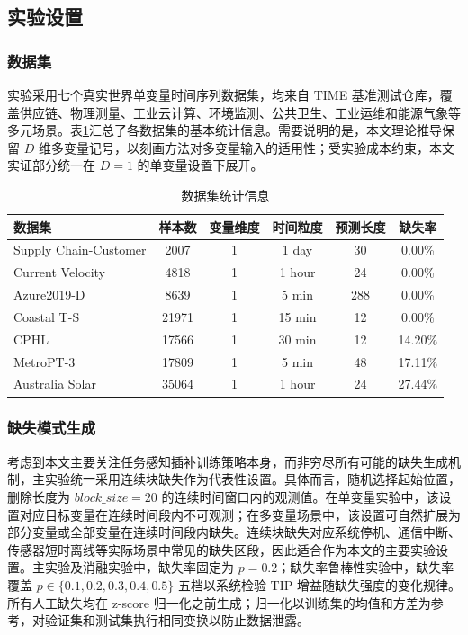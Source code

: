 \documentclass{article}
\begin{document}
\subsection{实验设置}

\subsubsection{数据集}

实验采用七个真实世界单变量时间序列数据集，均来自 TIME\citep{qiao2026} 基准测试仓库，覆盖供应链、物理测量、工业云计算、环境监测、公共卫生、工业运维和能源气象等多元场景。表\ref{tab:dataset_stats}汇总了各数据集的基本统计信息。需要说明的是，本文理论推导保留 $D$ 维多变量记号，以刻画方法对多变量输入的适用性；受实验成本约束，本文实证部分统一在 $D=1$ 的单变量设置下展开。

\begin{table}[htbp]
\centering
\caption{数据集统计信息}
\label{tab:dataset_stats}
\footnotesize
\begin{tabular}{lccccc}
\toprule
数据集 & 样本数 & 变量维度 & 时间粒度 & 预测长度 & 缺失率\\
\midrule
Supply Chain-Customer & 2007 & 1 & 1 day & 30 & 0.00\%\\
Current Velocity & 4818 & 1 & 1 hour & 24 & 0.00\%\\
Azure2019-D & 8639 & 1 & 5 min & 288 & 0.00\%\\
Coastal T-S & 21971 & 1 & 15 min & 12 & 0.00\%\\
CPHL & 17566 & 1 & 30 min & 12 & 14.20\%\\
MetroPT-3 & 17809 & 1 & 5 min & 48 & 17.11\%\\
Australia Solar & 35064 & 1 & 1 hour & 24 & 27.44\%\\
\bottomrule
\end{tabular}
\end{table}

\subsubsection{缺失模式生成}

考虑到本文主要关注任务感知插补训练策略本身，而非穷尽所有可能的缺失生成机制，主实验统一采用连续块缺失作为代表性设置。具体而言，随机选择起始位置，删除长度为 $block\_size = 20$ 的连续时间窗口内的观测值。在单变量实验中，该设置对应目标变量在连续时间段内不可观测；在多变量场景中，该设置可自然扩展为部分变量或全部变量在连续时间段内缺失。连续块缺失对应系统停机、通信中断、传感器短时离线等实际场景中常见的缺失区段，因此适合作为本文的主要实验设置。主实验及消融实验中，缺失率固定为 $p = 0.2$；缺失率鲁棒性实验中，缺失率覆盖 $p \in \{0.1, 0.2, 0.3, 0.4, 0.5\}$ 五档以系统检验 TIP 增益随缺失强度的变化规律。所有人工缺失均在 z-score 归一化之前生成；归一化以训练集的均值和方差为参考，对验证集和测试集执行相同变换以防止数据泄露。
\end{document}
